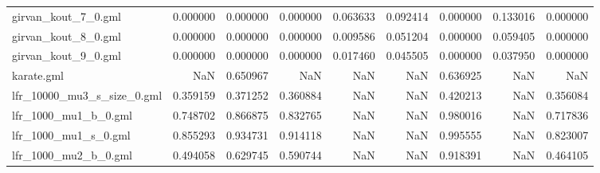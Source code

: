 \begin{tabular}{lrrrrrrrr}
girvan\_kout\_7\_0.gml        &                            0.000000 &                       0.000000 &                          0.000000 &                      0.063633 &                        0.092414 &                     0.000000 &                            0.133016 &                                0.000000 \\
girvan\_kout\_8\_0.gml        &                            0.000000 &                       0.000000 &                          0.000000 &                      0.009586 &                        0.051204 &                     0.000000 &                            0.059405 &                                0.000000 \\
girvan\_kout\_9\_0.gml        &                            0.000000 &                       0.000000 &                          0.000000 &                      0.017460 &                        0.045505 &                     0.000000 &                            0.037950 &                                0.000000 \\
karate.gml                 &                                 NaN &                       0.650967 &                               NaN &                           NaN &                             NaN &                     0.636925 &                                 NaN &                                     NaN \\
lfr\_10000\_mu3\_s\_size\_0.gml &                            0.359159 &                       0.371252 &                          0.360884 &                           NaN &                             NaN &                     0.420213 &                                 NaN &                                0.356084 \\
lfr\_1000\_mu1\_b\_0.gml       &                            0.748702 &                       0.866875 &                          0.832765 &                           NaN &                             NaN &                     0.980016 &                                 NaN &                                0.717836 \\
lfr\_1000\_mu1\_s\_0.gml       &                            0.855293 &                       0.934731 &                          0.914118 &                           NaN &                             NaN &                     0.995555 &                                 NaN &                                0.823007 \\
lfr\_1000\_mu2\_b\_0.gml       &                            0.494058 &                       0.629745 &                          0.590744 &                           NaN &                             NaN &                     0.918391 &                                 NaN &                                0.464105 \\

\end{tabular}
